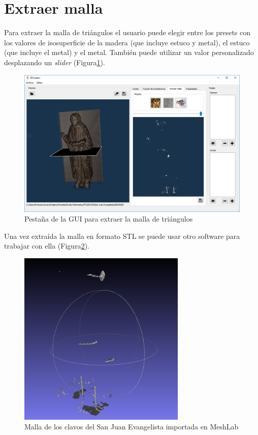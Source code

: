 \section{Extraer malla}

Para extraer la malla de triángulos el usuario puede elegir entre los presets con los valores de isosuperficie de la madera (que incluye estuco y metal), el estuco (que incluye el metal) y el metal. También puede utilizar un valor personalizado desplazando un \textit{slider} (Figura\ref{fig:pestana_malla}).

\begin{figure}[H]
	\centering
	\includegraphics[width=12.5cm]{imagenes/pestana_malla}
	\caption{Pestaña de la GUI para extraer la malla de triángulos}
	\label{fig:pestana_malla}
\end{figure}

Una vez extraída la malla en formato STL se puede usar otro software para trabajar con ella (Figura\ref{fig:malla_clavos_meshlab}).

\begin{figure}[H]
	\centering
	\includegraphics[width=8cm]{imagenes/malla_clavos_meshlab}
	\caption{Malla de los clavos del San Juan Evangelista importada en MeshLab \cite{meshlab}}
	\label{fig:malla_clavos_meshlab}
\end{figure}
